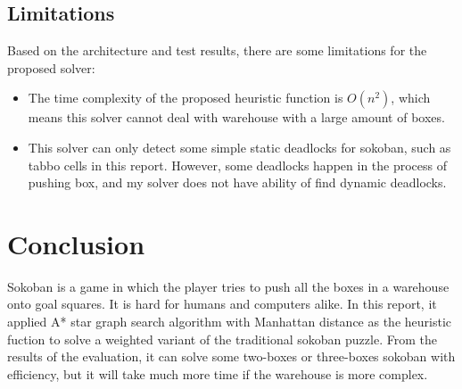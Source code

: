 \documentclass{article}
\begin{document}
\begin{table}[htp!]
\centering
{}
\caption{Running time, number of boxes and costs for part of tests}\label{tab:table}
\end{table}

\subsection{Limitations}
Based on the architecture and test results, there are some limitations for the proposed solver:
\begin{itemize}
\item The time complexity of the proposed heuristic function is $O(n^2)$, which means this solver cannot deal with warehouse with a large amount of boxes.
\item This solver can only detect some simple static deadlocks for sokoban, such as tabbo cells in this report. However, some deadlocks happen in the process of pushing box, and my solver does not have ability of find dynamic deadlocks.
\end{itemize}

\section{Conclusion}

Sokoban is a game in which the player tries to push all the boxes in a warehouse onto goal squares. It is hard for humans and computers alike. In this report, it applied A* star graph search algorithm with Manhattan distance as the heuristic fuction to solve a weighted variant of the traditional sokoban puzzle. From the results of the evaluation, it can solve some two-boxes or three-boxes sokoban with efficiency, but it will take much more time if the warehouse is more complex.


  
\end{document}
